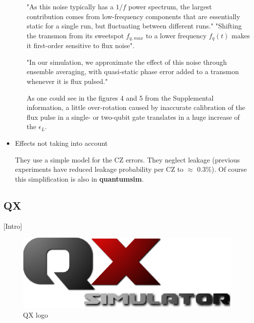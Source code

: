 \begin{itemize}
\begin{itemize}
"As this noise typically has a \(1/f\) power spectrum, the largest contribution comes from low-frequency components that are essentially static for a single run, but fluctuating between different runs."
"Shifting the transmon from its sweetspot \(f_{q,max}\) to a lower frequency \(f_q (t)\) makes it first-order sensitive to flux noise".

"In our simulation, we approximate the effect of this noise through ensemble averaging, with quasi-static phase error added to a transmon whenever it is flux pulsed."

As one could see in the figures 4 and 5 from the Supplemental information, a little over-rotation  caused by inaccurate calibration of the flux pulse in a single- or two-qubit gate translates in a huge increase of the \(\epsilon_L\).
\end{itemize}


\item Effects not taking into account
\label{sec:org2e788fe}

They use a simple model for the CZ errors.
They neglect leakage (previous experiments have reduced leakage probability per CZ to \(\approx\) 0.3\%).
Of course this simplification is also in \textbf{quantumsim}.
\end{itemize}

\subsection*{QX}
\label{sec:org1ca72a8}

[Intro]

\begin{figure}
\centering
\begin{minipage}{.4\textwidth}

\begin{center}
\includegraphics[width=.9\linewidth]{figures/qx.png}
\end{center}

\caption{QX logo}
\label{fig:qx_logo}
\end{minipage}
\end{figure}

